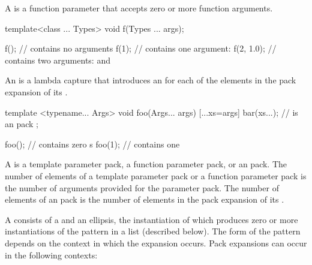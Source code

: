 \pnum
A  is a function parameter
that accepts zero or more function arguments.
\begin{example}
\begin{codeblock}
template<class ... Types> void f(Types ... args);

f();                            //  contains no arguments
f(1);                           //  contains one argument: 
f(2, 1.0);                      //  contains two arguments:  and 
\end{codeblock}
\end{example}

\pnum
An 
is a lambda capture that introduces an 
for each of the elements in the pack expansion of its .
\begin{example}
\begin{codeblock}
template <typename... Args>
void foo(Args... args) {
    [...xs=args]{
        bar(xs...);             //  is an  pack
    };
}

foo();                          //  contains zero s
foo(1);                         //  contains one 
\end{codeblock}
\end{example}

\pnum
A  is
a template parameter pack,
a function parameter pack,
or an  pack.
The number of elements of a template parameter pack
or a function parameter pack
is the number of arguments provided for the parameter pack.
The number of elements of an  pack
is the number of elements in the pack expansion of its .

\pnum
{}%
A 
consists of a  and an ellipsis, the instantiation of which
produces zero or more instantiations of the pattern in a list (described below).
The form of the pattern
depends on the context in which the expansion occurs. Pack
expansions can occur in the following contexts:

